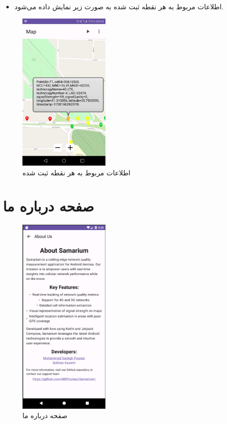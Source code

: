 \documentclass[oneside]{report}
\begin{document}
\begin{itemize}
      \item اطلاعات مربوط به هر نقطه ثبت شده به صورت زیر نمایش داده می‌شود.
\end{itemize}
\begin{center}
      \begin{figure}[H]
            \centering
            \includegraphics[width=0.4\textwidth]{../images/detail.jpg}
            \caption{اطلاعات مربوط به هر نقطه ثبت شده}
      \end{figure}
\end{center}

\section{صفحه درباره ما}
\begin{center}
      \begin{figure}[H]
            \centering
            \includegraphics[width=0.4\textwidth]{../images/about_us.png}
            \caption{صفحه درباره ما}
      \end{figure}
\end{center}
\end{document}
